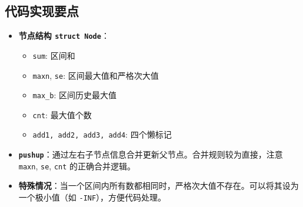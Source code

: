 \subsection*{代码实现要点}
\begin{itemize}
\item \textbf{节点结构 \texttt{struct Node}}：
\begin{itemize}
\item \texttt{sum}: 区间和
\item \texttt{maxn}, \texttt{se}: 区间最大值和严格次大值
\item \texttt{max\_b}: 区间历史最大值
\item \texttt{cnt}: 最大值个数
\item \texttt{add1, add2, add3, add4}: 四个懒标记
\end{itemize}
\item \textbf{\texttt{pushup}}：通过左右子节点信息合并更新父节点。合并规则较为直接，注意 \texttt{maxn}, \texttt{se}, \texttt{cnt} 的正确合并逻辑。
\item \textbf{特殊情况}：当一个区间内所有数都相同时，严格次大值不存在。可以将其设为一个极小值（如 \texttt{-INF}），方便代码处理。
\end{itemize}
